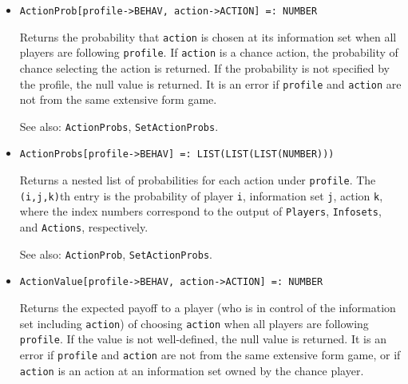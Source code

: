 \begin{itemize}




\item{}
\protect \large \begin{verbatim}
ActionProb[profile->BEHAV, action->ACTION] =: NUMBER 
\end{verbatim}\normalsize

\bd
{}
Returns the probability that \verb+action+ is chosen at its
information set when all players are following \verb+profile+.
If \verb+action+ is a chance action, the probability of chance selecting
the action is returned.  If the probability is not specified by the 
profile, the null value is returned.  It is an error if \verb+profile+
and \verb+action+ are not from the same extensive form game.

\item [See also:] \verb+ActionProbs+, \verb+SetActionProbs+.
\ed

\item{}
\protect \large \begin{verbatim}
ActionProbs[profile->BEHAV] =: LIST(LIST(LIST(NUMBER))) 
\end{verbatim}\normalsize

\bd 
Returns a nested list of probabilities for each action under
\verb+profile+.  The \verb+(i,j,k)+th entry is the probability of
player \verb+i+, information set \verb+j+, action \verb+k+, where the
index numbers correspond to the output of \verb+Players+, \verb+Infosets+,
and \verb+Actions+, respectively. 

\item [See also:] \verb+ActionProb+, \verb+SetActionProbs+.
\ed

\item{}
\protect \large \begin{verbatim}
ActionValue[profile->BEHAV, action->ACTION] =: NUMBER 
\end{verbatim}\normalsize

\bd 
Returns the expected payoff to a player (who is in control of the
information set including \verb+action+) of choosing \verb+action+ when
all players are following \verb+profile+.  If the value is not
well-defined, the null value is returned.  It is an error if
\verb+profile+ and \verb+action+ are not from the same extensive form
game, or if \verb+action+ is an action at an information set owned by
the chance player.


\end{itemize}
